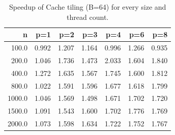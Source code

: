 \begin{table}[ht]
\centering
\small
\begin{tabular}{rrrrrrr}
\hline
n & p=1 & p=2 & p=3 & p=4 & p=6 & p=8 \\
\hline
100.0 & 0.992 & 1.207 & 1.164 & 0.996 & 1.266 & 0.935 \\
200.0 & 1.046 & 1.736 & 1.473 & 2.033 & 1.604 & 1.840 \\
400.0 & 1.272 & 1.635 & 1.567 & 1.745 & 1.600 & 1.812 \\
800.0 & 1.022 & 1.591 & 1.596 & 1.677 & 1.618 & 1.799 \\
1000.0 & 1.046 & 1.569 & 1.498 & 1.671 & 1.702 & 1.720 \\
1500.0 & 1.091 & 1.543 & 1.600 & 1.702 & 1.776 & 1.769 \\
2000.0 & 1.073 & 1.598 & 1.634 & 1.722 & 1.752 & 1.767 \\
\hline
\end{tabular}
\caption{Speedup of Cache tiling (B=64) for every size and thread count.}
\label{tab:speedup_all_sizes_tile}
\end{table}

